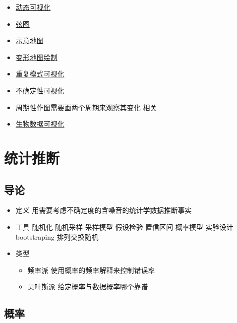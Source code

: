 \documentclass[]{book}
\providecommand{\tightlist}{%
  \setlength{\itemsep}{0pt}\setlength{\parskip}{0pt}}
\begin{document}
\begin{itemize}
\tightlist
\item
  \href{https://github.com/thomasp85/tweenr}{动态可视化}
\item
  \href{https://github.com/jokergoo/circlize}{弦图}
\item
  \href{https://github.com/hafen/geofacet}{示意地图}
\item
  \href{https://github.com/sjewo/cartogram}{变形地图绘制}
\item
  \href{https://flowingdata.com/2018/07/09/how-to-visualize-recurring-patterns/}{重复模式可视化}
\item
  \href{https://flowingdata.com/2018/01/08/visualizing-the-uncertainty-in-data/}{不确定性可视化}
\item
  周期性作图需要画两个周期来观察其变化 相关
\item
  \href{https://www.nature.com/articles/nbt.1567}{生物数据可视化}
\end{itemize}

\hypertarget{infer}{%
\chapter{统计推断}\label{infer}}

\hypertarget{ux5bfcux8bba}{%
\section{导论}\label{ux5bfcux8bba}}

\begin{itemize}
\tightlist
\item
  定义 用需要考虑不确定度的含噪音的统计学数据推断事实
\item
  工具 随机化 随机采样 采样模型 假设检验 置信区间 概率模型 实验设计 bootstraping 排列交换随机
\item
  类型

  \begin{itemize}
  \tightlist
  \item
    频率派 使用概率的频率解释来控制错误率
  \item
    贝叶斯派 给定概率与数据概率哪个靠谱
  \end{itemize}
\end{itemize}

\hypertarget{ux6982ux7387}{%
\section{概率}\label{ux6982ux7387}}
\end{document}
